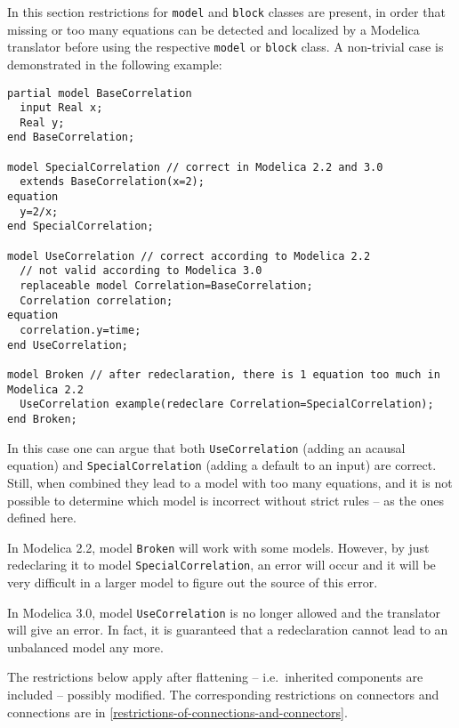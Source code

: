 \begin{nonnormative}
In this section restrictions for \lstinline!model! and \lstinline!block! classes are present, in order that missing or too many equations can be detected and localized by a Modelica translator before using the respective \lstinline!model! or \lstinline!block! class.  A non-trivial case is demonstrated in the following example:
\begin{lstlisting}[language=modelica]
partial model BaseCorrelation
  input Real x;
  Real y;
end BaseCorrelation;

model SpecialCorrelation // correct in Modelica 2.2 and 3.0
  extends BaseCorrelation(x=2);
equation
  y=2/x;
end SpecialCorrelation;

model UseCorrelation // correct according to Modelica 2.2
  // not valid according to Modelica 3.0
  replaceable model Correlation=BaseCorrelation;
  Correlation correlation;
equation
  correlation.y=time;
end UseCorrelation;

model Broken // after redeclaration, there is 1 equation too much in Modelica 2.2
  UseCorrelation example(redeclare Correlation=SpecialCorrelation);
end Broken;
\end{lstlisting}

In this case one can argue that both \lstinline!UseCorrelation! (adding an acausal equation) and \lstinline!SpecialCorrelation! (adding a default to an input) are correct.  Still, when combined they
lead to a model with too many equations, and it is not possible to determine which model is incorrect without strict rules -- as the ones defined here.

In Modelica 2.2, model \lstinline!Broken! will work with some models.
However, by just redeclaring it to model \lstinline!SpecialCorrelation!, an
error will occur and it will be very difficult in a larger model to
figure out the source of this error.

In Modelica 3.0, model \lstinline!UseCorrelation! is no longer allowed
and the translator will give an error. In fact, it is guaranteed that a
redeclaration cannot lead to an unbalanced model any more.
\end{nonnormative}

The restrictions below apply after flattening -- i.e.\ inherited components are included -- possibly modified.  The corresponding restrictions on connectors and connections are in
\cref{restrictions-of-connections-and-connectors}.

